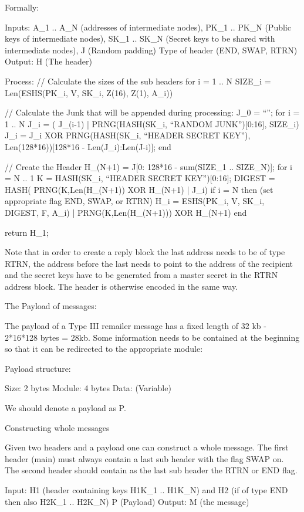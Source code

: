 Formally:

Inputs: A_1 .. A_N (addresses of intermediate nodes), 
	PK_1 .. PK_N (Public keys of intermediate nodes),
	SK_1 .. SK_N (Secret keys to be shared with intermediate nodes),
	J (Random padding)
	Type of header (END, SWAP, RTRN)
Output: H (The header)

Process: 
  // Calculate the sizes of the sub headers
  for i = 1 .. N
	SIZE_i = Len(ESHS(PK_i, V, SK_i, Z(16), Z(1), A_i))

  // Calculate the Junk that will be appended during processing:
  J_0 = ``'';
  for i = 1 .. N
	J_i = ( J_(i-1) | PRNG(HASH(SK_i, ``RANDOM JUNK'')[0:16], SIZE_i)
	J_i = J_i XOR PRNG(HASH(SK_i, ``HEADER SECRET KEY''),
  		Len(128*16))[128*16 - Len(J_i):Len(J-i)];
  end

  // Create the Header
  H_(N+1) = J[0: 128*16 - sum(SIZE_1 .. SIZE_N)];
  for i = N .. 1
	K = HASH(SK_i, ``HEADER SECRET KEY'')[0:16];
  	DIGEST = HASH( PRNG(K,Len(H_(N+1)) XOR H_(N+1) | J_i)
	if i = N then (set appropriate flag END, SWAP, or RTRN)
	H_i = ESHS(PK_i, V, SK_i, DIGEST, F, A_i) | PRNG(K,Len(H_(N+1))) XOR H_(N+1)
  end

return H_1;

Note that in order to create a reply block the last address needs to
be of type RTRN, the address before the last needs to point to the
address of the recipient and the secret keys have to be generated
from a master secret in the RTRN address block. The header is
otherwise encoded in the same way.

The Payload of messages:

The payload of a Type III remailer message has a fixed length of 32 kb
- 2*16*128 bytes = 28kb. Some information needs to be contained at the
beginning so that it can be redirected to the appropriate module:

Payload structure:

Size:   2 bytes
Module: 4 bytes
Data:   (Variable)

We should denote a payload as P.

Constructing whole messages

Given two headers and a payload one can construct a whole
message. The first header (main) must always contain a last sub header
with the flag SWAP on. The second header should contain as the last
sub header the RTRN or END flag.

Input: H1 (header containing keys H1K_1 .. H1K_N)
       and H2 (if of type END then also H2K_1 .. H2K_N)
       P (Payload)
Output: M (the message)

